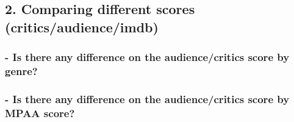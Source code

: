 \documentclass[]{article}
\begin{document}
\hypertarget{comparing-different-scores-criticsaudienceimdb-1}{%
\subsection{2. Comparing different scores
(critics/audience/imdb)}\label{comparing-different-scores-criticsaudienceimdb-1}}

\hypertarget{is-there-any-difference-on-the-audiencecritics-score-by-genre}{%
\subsubsection{- Is there any difference on the audience/critics score
by
genre?}\label{is-there-any-difference-on-the-audiencecritics-score-by-genre}}

\hypertarget{is-there-any-difference-on-the-audiencecritics-score-by-mpaa-score}{%
\subsubsection{- Is there any difference on the audience/critics score
by MPAA
score?}\label{is-there-any-difference-on-the-audiencecritics-score-by-mpaa-score}}
\end{document}
